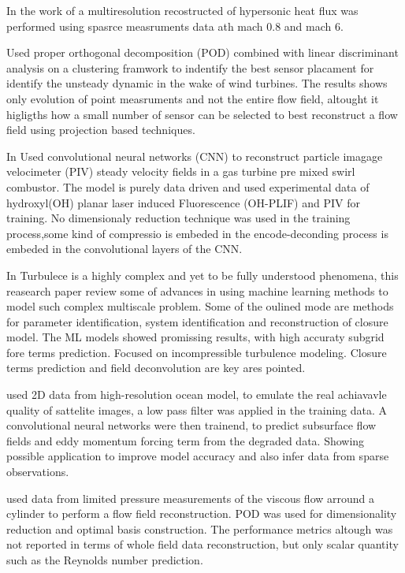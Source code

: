 In the work of \cite{massaMultiresolution2022} a multiresolution recostructed of hypersonic heat flux was performed using spasrce measruments data ath mach 0.8 and mach 6. 

\cite{aliClustering2021} Used proper orthogonal decomposition (POD) combined with linear discriminant analysis on a clustering framwork to indentify the best sensor placament for identify the unsteady dynamic in the wake of wind turbines. The results shows only evolution of point measruments and not the entire flow field, altought it higligths how a small number of sensor can be selected to best reconstruct a flow field using projection based techniques. 

In \cite{barweyUsing2022} Used convolutional neural networks (CNN) to reconstruct particle imagage velocimeter (PIV) steady velocity fields in a gas turbine pre mixed swirl combustor. The model is purely data driven and used experimental data of hydroxyl(OH) planar laser induced Fluorescence (OH-PLIF) and PIV for training. No dimensionaly reduction technique was used in the training process,some kind of compressio is embeded in the encode-deconding process is embeded in the convolutional layers of the CNN.

In \cite{beckPerspective2021} Turbulece is a highly complex and yet to be fully understood phenomena, this reasearch paper review some of advances in using machine learning methods to model such complex multiscale problem. Some of the oulined mode are methods for parameter identification, system identification and reconstruction of closure model. The ML models showed promissing results, with high accuraty subgrid fore terms prediction. Focused on incompressible turbulence modeling. Closure terms prediction and field deconvolution are key ares pointed.

\cite{boltonApplications2019} used 2D  data from high-resolution ocean model, to emulate the real achiavavle quality of sattelite images, a low pass filter was applied in the training data. A convolutional neural networks were then trainend, to predict subsurface flow fields and eddy momentum forcing term from the degraded data. Showing possible application to improve model accuracy and also infer data from sparse observations.

\cite{brightCompressive2013} used data from limited pressure measurements of the viscous  flow arround a cylinder to perform a flow field reconstruction. POD was used for dimensionality reduction and optimal basis construction. The performance metrics altough was not reported in terms of whole field data reconstruction, but only scalar quantity such as the Reynolds number prediction. 

